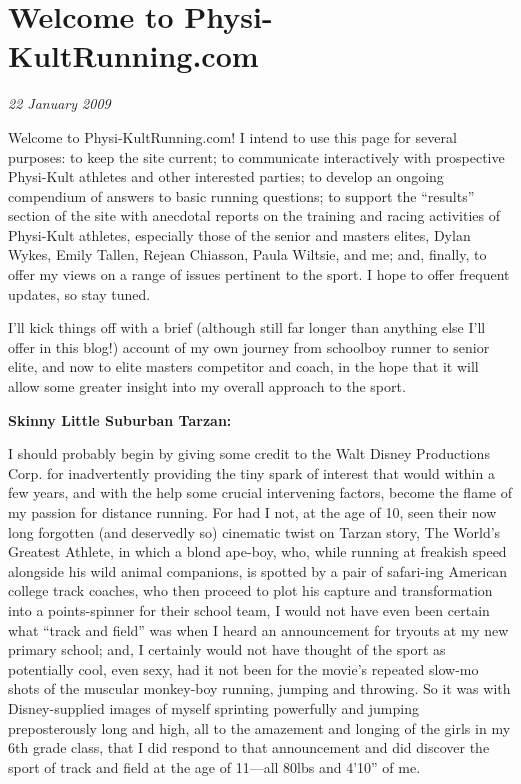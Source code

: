 \chapter{Welcome to Physi-KultRunning.com}
\textit{22 January 2009}
\bigskip

Welcome to Physi-KultRunning.com! I intend to use this page for several purposes: to keep the site current; to communicate interactively with prospective Physi-Kult athletes and other interested parties; to develop an ongoing compendium of answers to basic running questions; to support the “results” section of the site with anecdotal reports on the training and racing activities of Physi-Kult athletes, especially those of the senior and masters elites, Dylan Wykes, Emily Tallen, Rejean Chiasson, Paula Wiltsie, and me; and, finally, to offer my views on a range of issues pertinent to the sport. I hope to offer frequent updates, so stay tuned.

I’ll kick things off with a brief (although still far longer than anything else I’ll offer in this blog!) account of my own journey from schoolboy runner to senior elite, and now to elite masters competitor and coach, in the hope that it will allow some greater insight into my overall approach to the sport.

\bigskip
\textbf{Skinny Little Suburban Tarzan:}
\bigskip

I should probably begin by giving some credit to the Walt Disney Productions Corp. for inadvertently providing the tiny spark of interest that would within a few years, and with the help some crucial intervening factors, become the flame of my passion for distance running. For had I not, at the age of 10, seen their now long forgotten (and deservedly so) cinematic twist on Tarzan story, The World’s Greatest Athlete, in which a blond ape-boy, who, while running at freakish speed alongside his wild animal companions, is spotted by a pair of safari-ing American college track coaches, who then proceed to plot his capture and transformation into a points-spinner for their school team, I would not have even been certain what “track and field” was when I heard an announcement for tryouts at my new primary school; and, I certainly would not have thought of the sport as potentially cool, even sexy, had it not been for the movie’s repeated slow-mo shots of the muscular monkey-boy running, jumping and throwing. So it was with Disney-supplied images of myself sprinting powerfully and jumping preposterously long and high, all to the amazement and longing of the girls in my 6th grade class, that I did respond to that announcement and did discover the sport of track and field at the age of 11—all 80lbs and 4'10'' of me.


